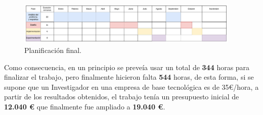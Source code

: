     \begin{figure}[!h]
        \centering
        \includegraphics[width=0.95\textwidth]{img/plan_definitivo.png}
        \caption{Planificación final.}
        \label{Fig::Planificacion final}
    \end{figure}

    \medskip

    \noindent Como consecuencia, en un principio se preveía usar un total de \textbf{344} horas para finalizar el trabajo, pero finalmente hicieron falta \textbf{544} horas, de esta forma, si se supone que un Investigador en una empresa de base tecnológica es de 35€/hora, a partir de los resultados obtenidos, el trabajo tenía un presupuesto inicial de \textbf{12.040 €} que finalmente fue ampliado a \textbf{19.040 €}.

\endinput


